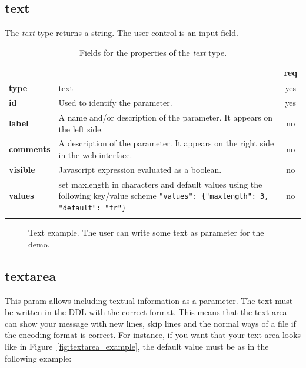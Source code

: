 \subsection{text}

The \emph{text} type returns a string. The user control is an input field.

\begin{longtable}{|>{\bf}L{\linewidth}|L{\linewidth}|c|}
\hline
      &  & {\bf req} 
\tabularnewline \hline \hline
 type       & text   & yes \\ \hline
 id     & Used to identify the parameter. & yes \\ \hline
 label  & A name and/or description of the parameter. It appears on the left side. & no
                      \\ \hline
 comments & A description of the parameter. It appears on the right side in the web interface. & no
                      \\ \hline
 visible    & Javascript expression evaluated as a boolean. & no \\ \hline
 values     & set maxlength in characters and default values using the following key/value scheme \texttt{"values": \{"maxlength": 3, "default": "fr"\}} & no \\ \hline
\caption{Fields for the properties of the \emph{text} type.}
\end{longtable}

\begin{figure}[h]
\centering
{}
\caption{Text example. The user can write some text as parameter for the demo.}
\label{fig:text_example}
\end{figure}


\subsection{textarea}

This param allows including textual information as a parameter. The text must be written in the DDL with the correct format. This means that the text area can show your message with new lines, skip lines and the normal ways of a file if the encoding format is correct. For instance, if you want that your text area looks like in Figure~\ref{fig:textarea_example}, the default value must be as in the following example:

